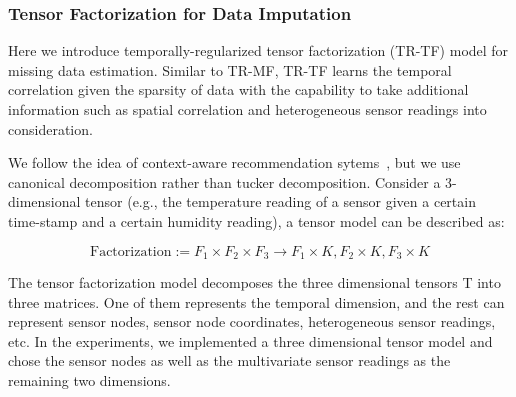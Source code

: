 \subsubsection{Tensor Factorization for Data Imputation} \label{sec:tfmissing}


Here we introduce temporally-regularized tensor factorization (TR-TF) model for missing data estimation. 
Similar to TR-MF, TR-TF learns the temporal correlation given the sparsity of data with the capability to take additional information such as spatial correlation and heterogeneous sensor readings into consideration.

We follow the idea of context-aware recommendation sytems~\cite{karatzoglou2010multiverse}, but we use canonical decomposition rather than tucker decomposition.
Consider a 3-dimensional tensor (e.g., the temperature reading of a sensor given a certain time-stamp and a certain humidity reading), a tensor model can be described as:

\vspace{-0.6cm}
{\small
\begin{equation*}
\mbox{Factorization} :=  F_1 \times  F_2 \times F_3 \rightarrow F_1 \times K, F_2 \times K, F_3 \times K
\end{equation*}
}
\vspace{-0.6cm}

The tensor factorization model decomposes the three dimensional tensors T into three matrices. One of them represents the temporal dimension, and the rest can represent sensor nodes, sensor node coordinates, heterogeneous sensor readings, etc. In the experiments, we implemented a three dimensional tensor model and chose the sensor nodes as well as the multivariate sensor readings as the remaining two dimensions.

